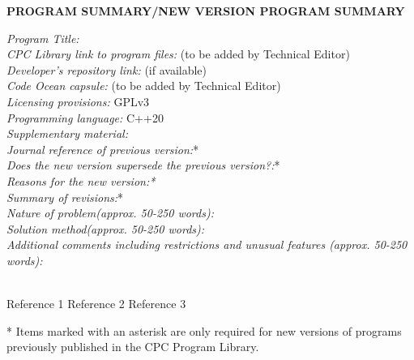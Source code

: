 \documentclass[preprint,12pt]{elsarticle}
\begin{document}


{\bf PROGRAM SUMMARY/NEW VERSION PROGRAM SUMMARY}

\begin{small}
\noindent
{\em Program Title:}                                          \\
{\em CPC Library link to program files:} (to be added by Technical Editor) \\
{\em Developer's repository link:} (if available) \\
{\em Code Ocean capsule:} (to be added by Technical Editor)\\
{\em Licensing provisions:} GPLv3  \\
{\em Programming language:} C++20                             \\
{\em Supplementary material:}                                 \\
{\em Journal reference of previous version:}*                  \\
{\em Does the new version supersede the previous version?:}*   \\
{\em Reasons for the new version:*}\\
{\em Summary of revisions:}*\\
{\em Nature of problem(approx. 50-250 words):}\\
{\em Solution method(approx. 50-250 words):}\\
{\em Additional comments including restrictions and unusual features (approx. 50-250 words):}\\
   \\

\begin{thebibliography}{0}
Reference 1         %
Reference 2         %
Reference 3         %
\end{thebibliography}
* Items marked with an asterisk are only required for new versions
of programs previously published in the CPC Program Library.\\
\end{small}
\end{document}

